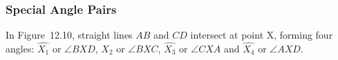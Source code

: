             \subsubsection{ Special Angle Pairs}
            \nopagebreak
        \label{m39370*id315274}In Figure~12.10, straight lines $AB$ and \begin{math}CD\end{math} intersect at point X, forming four angles: \begin{math}\hat{{X}_{1}}\end{math} or \begin{math}\angle BXD\end{math}\hspace{1ex}, \begin{math}\hat{{X}_{2}}\end{math}\hspace{1ex} or \begin{math}\angle BXC\end{math}\hspace{1ex}, \begin{math}\hat{{X}_{3}}\end{math}\hspace{1ex} or \begin{math}\angle CXA\end{math}\hspace{1ex} and \begin{math}\hat{{X}_{4}}\end{math}\hspace{1ex} or \begin{math}\angle AXD\end{math}\hspace{1ex}.\par 
    \setcounter{subfigure}{0}
